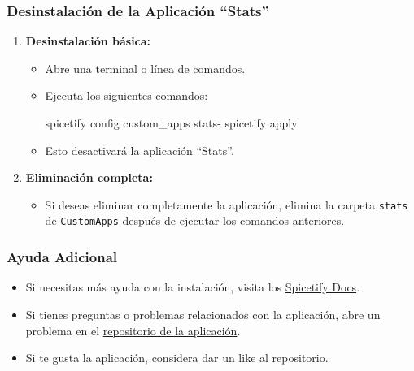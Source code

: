 \documentclass[
  jou,
  floatsintext,
  longtable,
  a4paper,
  nolmodern,
  notxfonts,
  notimes,
  12pt,
  colorlinks=true,linkcolor=blue,citecolor=blue,urlcolor=blue]{apa7}
\newenvironment{Shaded}{\begin{snugshade}}{\end{snugshade}}
\newcommand{\ExtensionTok}[1]{\textcolor[rgb]{0.00,0.23,0.31}{#1}}
\newcommand{\NormalTok}[1]{\textcolor[rgb]{0.00,0.23,0.31}{#1}}
\providecommand{\tightlist}{%
  \setlength{\itemsep}{0pt}\setlength{\parskip}{0pt}}
\begin{document}
\subsubsection{Desinstalación de la Aplicación
``Stats''}\label{desinstalaciuxf3n-de-la-aplicaciuxf3n-stats}

\begin{enumerate}
\def\labelenumi{\arabic{enumi}.}
\tightlist
\item
  \textbf{Desinstalación básica:}

  \begin{itemize}
  \item
    Abre una terminal o línea de comandos.
  \item
    Ejecuta los siguientes comandos:

\begin{Shaded}
\begin{Highlighting}[]
\ExtensionTok{spicetify}\NormalTok{ config custom\_apps stats{-}}
\ExtensionTok{spicetify}\NormalTok{ apply}
\end{Highlighting}
\end{Shaded}
  \item
    Esto desactivará la aplicación ``Stats''.
  \end{itemize}
\item
  \textbf{Eliminación completa:}

  \begin{itemize}
  \tightlist
  \item
    Si deseas eliminar completamente la aplicación, elimina la carpeta
    \texttt{stats} de \texttt{CustomApps} después de ejecutar los
    comandos anteriores.
  \end{itemize}
\end{enumerate}

\subsubsection{Ayuda Adicional}\label{ayuda-adicional}

\begin{itemize}
\tightlist
\item
  Si necesitas más ayuda con la instalación, visita los
  \href{https://github.com/khanhas/spicetify-cli/wiki}{Spicetify Docs}.
\item
  Si tienes preguntas o problemas relacionados con la aplicación, abre
  un problema en el \href{https://github.com/}{repositorio de la
  aplicación}.
\item
  Si te gusta la aplicación, considera dar un like al repositorio.
\end{itemize}
\end{document}
